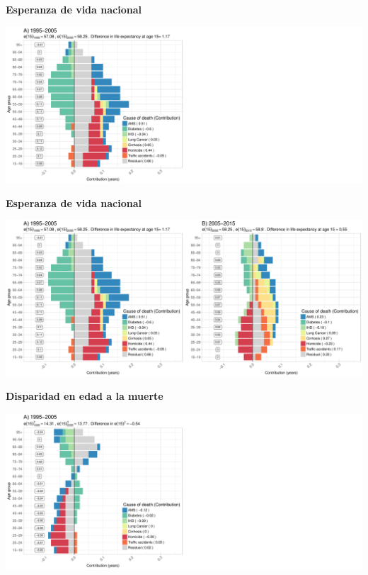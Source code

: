 \documentclass[xcolor={dvipsnames}]{beamer}
\begin{document}
\begin{frame}
\begin{center}
\Large{\textbf{Esperanza de vida nacional}}
\end{center}

\hspace*{-1cm}   
\includegraphics[scale=.31]{Figures/Figure_1_2}

\end{frame}


\begin{frame}
\begin{center}
\Large{\textbf{Esperanza de vida nacional}}
\end{center}

\hspace*{-1cm}   
\includegraphics[scale=.31]{Figures/Figure_1}

\end{frame}


\begin{frame}
\begin{center}
\Large{\textbf{Disparidad en edad a la muerte }}
\end{center}

\hspace*{-1cm}   
\includegraphics[scale=.31]{Figures/Figure_2_2}

\end{frame}
\end{document}
